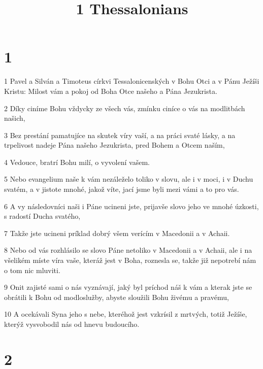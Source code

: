 

\title{1 Thessalonians}

\chapter{1}

\par 1 Pavel a Silván a Timoteus církvi Tessalonicenských v Bohu Otci a v Pánu Ježíši Kristu: Milost vám a pokoj od Boha Otce našeho a Pána Jezukrista.
\par 2 Díky ciníme Bohu vždycky ze všech vás, zmínku ciníce o vás na modlitbách našich,
\par 3 Bez prestání pamatujíce na skutek víry vaší, a na práci svaté lásky, a na trpelivost nadeje Pána našeho Jezukrista, pred Bohem a Otcem naším,
\par 4 Vedouce, bratrí Bohu milí, o vyvolení vašem.
\par 5 Nebo evangelium naše k vám nezáleželo toliko v slovu, ale i v moci, i v Duchu svatém, a v jistote mnohé, jakož víte, jací jsme byli mezi vámi a to pro vás.
\par 6 A vy následovníci naši i Páne ucineni jste, prijavše slovo jeho ve mnohé úzkosti, s radostí Ducha svatého,
\par 7 Takže jste ucineni príklad dobrý všem verícím v Macedonii a v Achaii.
\par 8 Nebo od vás rozhlásilo se slovo Páne netoliko v Macedonii a v Achaii, ale i na všelikém míste víra vaše, kteráž jest v Boha, roznesla se, takže již nepotrebí nám o tom nic mluviti.
\par 9 Onit zajisté sami o nás vyznávají, jaký byl príchod náš k vám a kterak jste se obrátili k Bohu od modloslužby, abyste sloužili Bohu živému a pravému,
\par 10 A ocekávali Syna jeho s nebe, kteréhož jest vzkrísil z mrtvých, totiž Ježíše, kterýž vysvobodil nás od hnevu budoucího.

\chapter{2}


